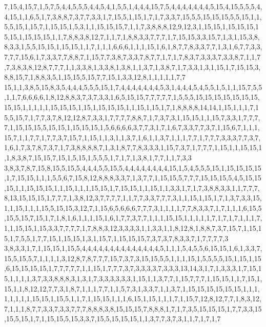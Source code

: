 7,15,4,15,7,1,5,7,5,4,4,5,5,5,4,4,5,4,1,5,5,1,4,4,4,15,7,5,4,4,4,4,4,4,4,5,15,4,15,5,5,5,4,4,15,1,1,6,5,1,7,3,8,8,7,3,7,7,3,3,1,7,15,5,1,15,1,7,1,7,3,3,7,15,5,5,15,15,15,5,5,15,1,1,5,5,15,1,15,7,1,15,15,1,5,3,1,1,15,15,15,7,1,1,7,3,8,8,8,12,9,12,3,1,15,15,1,15,15,15,15,15,1,15,15,15,1,1,7,8,8,3,8,12,7,1,1,7,1,8,8,3,3,7,7,7,1,7,15,15,3,3,15,7,1,3,1,15,3,8,8,3,3,1,5,5,15,15,1,15,15,1,1,7,1,1,1,6,6,6,1,1,1,15,1,6,1,8,7,7,8,3,3,7,7,1,3,1,6,7,7,3,3,7,7,7,15,6,1,7,3,3,7,7,8,8,7,1,15,7,7,3,8,7,3,3,7,8,7,7,1,7,1,7,8,3,7,3,3,3,7,3,3,8,7,1,1,7,7,3,8,3,8,12,8,7,7,7,1,1,3,3,8,1,3,3,8,1,3,8,1,1,3,7,1,3,8,7,1,7,3,3,1,3,1,15,1,7,15,15,3,8,8,15,7,1,8,8,3,5,1,15,15,5,15,7,7,15,1,3,3,12,8,1,1,1,1,1,7,7
15,1,1,3,8,5,15,8,3,5,4,4,4,5,5,5,15,1,7,4,4,4,4,4,4,4,5,3,1,4,4,4,5,4,5,5,1,5,1,1,15,7,5,5,1,1,7,6,6,6,6,1,8,12,8,8,3,7,3,7,3,3,1,6,5,15,15,7,7,7,7,7,1,5,5,5,15,15,15,15,15,15,15,15,15,1,1,1,1,1,15,15,15,1,15,1,15,15,15,1,1,15,1,15,1,7,1,8,8,8,8,14,14,1,15,1,1,1,7,15,5,15,7,1,7,7,3,7,8,12,12,8,7,3,3,1,7,7,7,7,8,8,7,1,7,3,7,3,1,15,15,1,1,15,7,3,3,1,7,7,7,7,1,15,15,15,5,15,15,1,15,15,15,1,5,6,6,6,6,3,7,7,3,1,7,1,6,7,3,3,7,7,3,7,1,15,6,7,1,1,1,15,7,1,1,7,7,1,7,7,3,7,15,7,1,15,1,1,3,1,1,3,7,1,6,1,1,3,7,1,1,1,7,7,1,7,7,7,3,3,3,7,7,3,7,1,6,1,7,3,7,8,7,3,7,1,7,3,8,8,8,8,7,1,3,1,8,7,7,8,3,3,3,1,15,7,3,7,1,7,7,7,1,15,1,1,15,15,1,1,8,3,8,7,15,15,7,15,1,5,15,1,5,5,5,1,7,1,7,1,3,8,1,7,7,1,1,7,3,3
3,8,3,7,8,7,15,8,15,5,15,5,4,4,4,5,5,15,5,4,4,4,4,4,4,4,4,15,1,5,4,5,5,5,15,1,15,15,15,15,1,7,15,15,1,1,1,5,5,6,7,15,8,12,8,8,8,3,3,7,1,3,7,7,1,15,15,5,7,7,7,15,15,15,5,4,5,15,15,15,1,1,15,15,15,1,1,15,1,1,1,15,15,1,7,15,15,1,1,15,1,1,3,3,1,7,1,7,3,8,8,3,3,1,1,7,7,7,8,13,15,15,15,1,7,7,7,1,3,8,12,3,7,7,7,7,1,1,7,7,3,3,7,7,7,3,1,1,15,1,15,1,7,1,3,7,3,3,15,1,1,15,1,1,1,15,5,15,15,3,12,7,1,15,6,5,6,6,6,7,7,7,3,1,1,1,1,7,7,8,3,3,7,1,7,1,1,1,6,15,5,15,5,15,7,15,1,7,1,8,1,6,1,1,1,15,1,6,1,7,7,3,7,7,1,1,1,15,15,1,1,1,1,1,7,1,7,1,7,1,1,1,7,1,1,15,15,1,15,3,3,7,7,7,7,1,7,8,8,3,12,3,3,3,3,1,1,3,3,1,1,8,12,8,1,8,8,7,3,7,15,7,1,15,15,1,7,5,5,1,7,7,15,1,15,15,1,3,1,15,7,1,15,15,15,7,3,7,3,7,8,3,3,7,1,7,7,7,7,3
3,8,3,3,1,7,1,15,15,1,15,5,4,4,4,4,4,4,4,4,4,4,4,4,4,4,5,1,1,1,5,4,5,5,6,15,15,1,6,1,3,3,7,15,5,15,5,7,1,1,1,1,3,12,8,7,8,7,7,7,15,7,3,7,3,15,15,5,5,1,1,1,15,1,5,5,5,5,15,1,15,1,15,6,15,15,15,15,1,7,7,7,7,7,1,1,15,1,7,7,7,3,7,3,3,3,3,7,3,3,3,13,14,3,1,7,1,3,3,3,1,7,15,15,1,1,1,1,3,7,3,3,8,8,8,3,1,3,1,7,3,3,3,3,3,3,1,15,1,1,3,7,7,1,15,7,7,7,1,15,15,1,1,7,15,1,15,1,1,8,12,12,7,7,3,1,8,7,1,1,1,7,7,1,1,5,7,3,1,3,3,7,1,1,3,7,1,15,15,15,15,15,15,1,1,1,1,1,1,1,1,15,15,1,15,5,1,1,7,1,15,15,1,1,1,6,15,1,15,1,1,1,7,1,15,7,12,8,12,7,7,1,8,3,12,7,1,1,1,8,7,7,3,3,7,3,3,7,7,7,8,8,8,3,8,15,15,15,7,8,8,8,1,7,1,7,3,5,15,15,15,1,7,7,3,3,15,15,5,15,1,7,1,15,15,5,15,3,3,7,15,5,15,15,15,1,1,3,7,7,3,7,3,1,1,7,1,7,1,7
